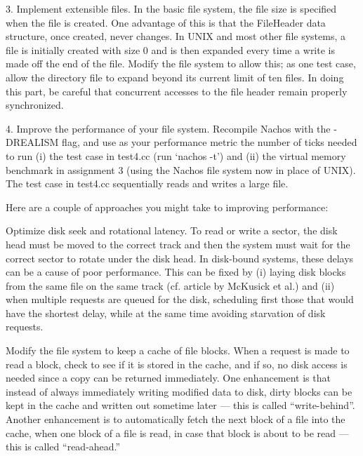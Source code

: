 \begin{description}
\item{3.}
Implement extensible files.  In the basic file system, the file
size is specified when the file is created.  One advantage of this
is that the FileHeader data structure, once created, never changes.
In UNIX and most other file systems, a file is initially created
with size 0 and is then expanded every time a write is made off the
end of the file.  Modify the file system to allow this; as one test
case, allow the directory file to expand beyond its current limit
of ten files.  In doing this part, be careful that concurrent
accesses to the file header remain properly synchronized.

\item{4.}
Improve the performance of your file system.
Recompile Nachos with the -DREALISM flag, and use as your
performance metric the number of ticks needed to run (i)
the test case in test4.cc (run `nachos -t') and (ii)
the virtual memory benchmark in assignment 3 (using the Nachos
file system now in place of UNIX).  The test case in test4.cc
sequentially reads and writes a large file.

Here are a couple of approaches you might take to improving performance:

\begin{description}

\item Optimize disk seek and rotational latency.  To read or write
a sector, the disk head must be moved to the correct track
and then the system must wait for the correct sector to rotate
under the disk head.  In disk-bound systems, these delays can
be a cause of poor performance.  This can be fixed by (i)
laying disk blocks from the same file on the same track
(cf. article by McKusick et al.) and (ii)
when multiple requests are queued for the disk, scheduling first
those that would have the shortest delay, while at the same
time avoiding starvation of disk requests.

\item Modify the file system to keep a cache of file blocks.
When a request is made to read a block, check to see if it is stored
in the cache, and
if so, no disk access is needed since a copy can be returned immediately.
One enhancement is that instead of always immediately writing modified
data to disk, dirty blocks can be kept in the cache and written out
sometime later --- this is called ``write-behind''.
Another enhancement is to
automatically fetch the next block of a file into the cache, when one
block of a file is read, in case that block is about to be read ---
this is called ``read-ahead.''


\end{description}
\end{description}
